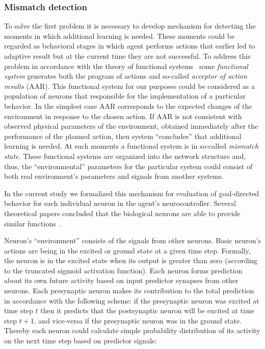 \documentclass[letterpaper]{article}
\begin{document}
\subsubsection{Mismatch detection} To solve the first problem it is necessary to develop mechanism for detecting the moments in which additional learning is needed. These moments could be regarded as behavioral stages in which agent performs actions that earlier led to adaptive result but at the current time they are not successful. To address this problem in accordance with the theory of functional systems~\citep{Anokhin1974} some {\em functional system} generates both the program of actions and so-called {\em acceptor of action results} (AAR).  This functional system for our purposes could be considered as a population of neurons that responsible for the implementation of a particular behavior. In the simplest case AAR corresponds to the expected changes of the environment in response to the chosen action. If AAR is not consistent with observed physical parameters of the environment, obtained immediately after the performance of the planned action, then system ``concludes'' that additional learning is needed. At such moments a functional system is in so-called {\em mismatch state}. These functional systems are organized into the network structure and, thus, the ``environmental'' parameters for the particular system could consist of both real environment's parameters and signals from another systems.   

In the current study we formalized this mechanism for evaluation of goal-directed behavior for each individual neuron in the agent's neurocontroller. Several theoretical papers concluded that the biological neurons are able to provide similar functions~\citep{Fiorillo2008}.

Neuron's ``environment'' consists of the signals from other neurons. Basic neuron's actions are being in the excited or ground state at a given time step. Formally, the neuron is in the excited state when its output is greater than zero (according to the truncated sigmoid activation function). Each neuron forms prediction about its own future activity based on input predictor synapses from other neurons. Each presynaptic neuron makes its contribution to the total prediction in accordance with the following scheme: if the presynaptic neuron was excited at time step $t$ then it predicts that the postsynaptic neuron will be excited at time step $t+1$, and vice-versa if the presynaptic neuron was in the ground state. Thereby each neuron could calculate simple probability distribution of its activity on the next time step based on predictor signals:
\end{document}
